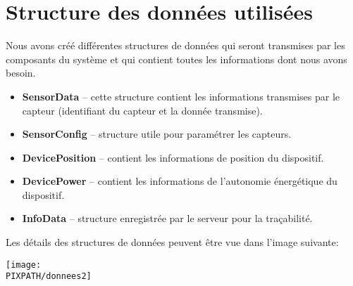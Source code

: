 \section{Structure des données utilisées} 

Nous avons créé différentes structures de données qui seront transmises par les 
composants du système et qui contient toutes les informations dont nous avons 
besoin. \\

\begin{itemize}
\item \textbf{SensorData} – cette structure contient les informations transmises par le capteur (identifiant du capteur et la donnée transmise).
\item \textbf{SensorConfig} –  structure utile pour paramétrer les capteurs.
\item \textbf{DevicePosition} – contient les informations de position du dispositif.
\item \textbf{DevicePower} – contient les informations de l’autonomie énergétique du dispositif.
\item \textbf{InfoData} – structure enregistrée par le serveur pour la traçabilité.
\end{itemize}

Les détails des structures de données peuvent être vue dans l'image suivante:

    \begin{center}
    \texttt{[image: \\PIXPATH/donnees2]}
    \end{center}
